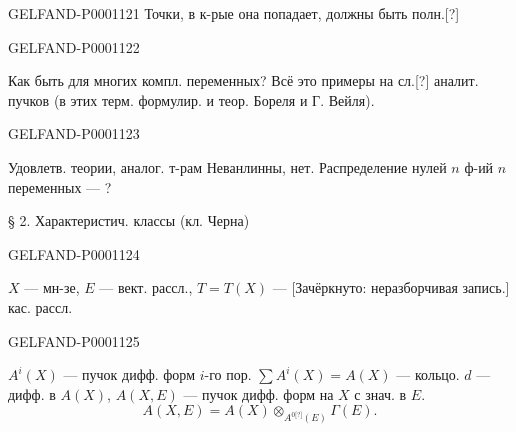 \begin{GelfandAdjacentEvidence}{GELFAND-P000112}{1}
Точки, в к-рые она попадает, должны быть полн.[?]
\end{GelfandAdjacentEvidence}
\begin{GelfandAdjacentEvidence}{GELFAND-P000112}{2}

Как быть для многих компл. переменных?
Всё это примеры на сл.[?] аналит. пучков (в этих терм. формулир.
и теор. Бореля и Г. Вейля).
\end{GelfandAdjacentEvidence}
\begin{GelfandAdjacentEvidence}{GELFAND-P000112}{3}

Удовлетв. теории, аналог. т-рам Неванлинны, нет.
Распределение нулей $n$ ф-ий $n$ переменных — ?

§ 2. Характеристич. классы (кл. Черна)
\end{GelfandAdjacentEvidence}
\begin{GelfandAdjacentEvidence}{GELFAND-P000112}{4}

$X$ — мн-зе, $E$ — вект. рассл., $T=T(X)$ —
[Зачёркнуто: неразборчивая запись.] кас. рассл.
\end{GelfandAdjacentEvidence}
\begin{GelfandAdjacentEvidence}{GELFAND-P000112}{5}

$A^i(X)$ — пучок дифф. форм $i$-го пор.
$\sum A^i(X)=A(X)$ — кольцо.
$d$ — дифф. в $A(X)$, $A(X,E)$ — пучок дифф. форм на $X$ с знач. в $E$.
\begin{equation*}A(X,E)=A(X)\otimes_{A^{0\text{[?]}}(E)}\Gamma(E).\end{equation*}
\end{GelfandAdjacentEvidence}
